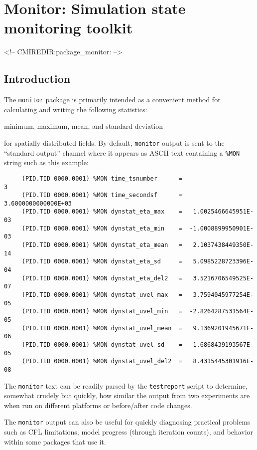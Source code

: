 \section{Monitor: Simulation state monitoring toolkit}
\label{sec:pkg:monitor}
\begin{rawhtml}
<!-- CMIREDIR:package_monitor: -->
\end{rawhtml}


\subsection{Introduction}
\label{sec:pkg:monitor:overview}


The \texttt{monitor} package is primarily intended as a convenient
method for calculating and writing the following statistics:
\begin{center}
  minimum, maximum, mean, and standard deviation
\end{center}
for spatially distributed fields.  By default, \texttt{monitor} output
is sent to the ``standard output'' channel where it appears as ASCII
text containing a \texttt{\%MON} string such as this example:
\begin{verbatim}
     (PID.TID 0000.0001) %MON time_tsnumber      =                     3
     (PID.TID 0000.0001) %MON time_secondsf      =   3.6000000000000E+03
     (PID.TID 0000.0001) %MON dynstat_eta_max    =   1.0025466645951E-03
     (PID.TID 0000.0001) %MON dynstat_eta_min    =  -1.0008899950901E-03
     (PID.TID 0000.0001) %MON dynstat_eta_mean   =   2.1037438449350E-14
     (PID.TID 0000.0001) %MON dynstat_eta_sd     =   5.0985228723396E-04
     (PID.TID 0000.0001) %MON dynstat_eta_del2   =   3.5216706549525E-07
     (PID.TID 0000.0001) %MON dynstat_uvel_max   =   3.7594045977254E-05
     (PID.TID 0000.0001) %MON dynstat_uvel_min   =  -2.8264287531564E-05
     (PID.TID 0000.0001) %MON dynstat_uvel_mean  =   9.1369201945671E-06
     (PID.TID 0000.0001) %MON dynstat_uvel_sd    =   1.6868439193567E-05
     (PID.TID 0000.0001) %MON dynstat_uvel_del2  =   8.4315445301916E-08
\end{verbatim}
The \texttt{monitor} text can be readily parsed by the
\texttt{testreport} script to determine, somewhat crudely but quickly,
how similar the output from two experiments are when run on different
platforms or before/after code changes.

The \texttt{monitor} output can also be useful for quickly diagnosing
practical problems such as CFL limitations, model progress (through
iteration counts), and behavior within some packages that use it.


